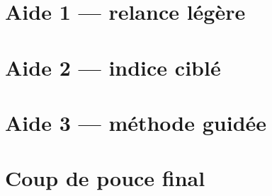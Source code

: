 \documentclass[a4paper,11pt]{article}
\begin{document}
\section*{Aide 1 — relance légère}
\section*{Aide 2 — indice ciblé}
\section*{Aide 3 — méthode guidée}
\section*{Coup de pouce final}
\end{document}
